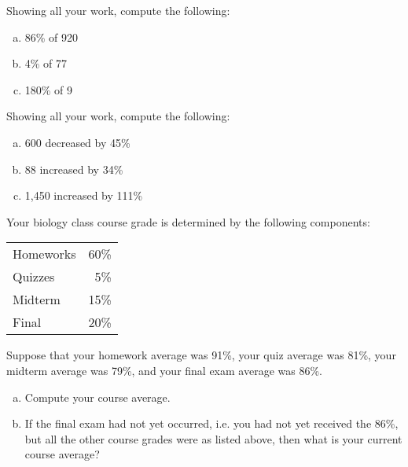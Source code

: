 \documentclass[11pt,letterpaper]{article}
\begin{document}

 Showing all your work, compute the following:
	\begin{enumerate}[(a)]
	\item 86\% of 920
	\item 4\% of 77
	\item 180\% of 9
	\end{enumerate}



\newpage



 Showing all your work, compute the following:
	\begin{enumerate}[(a)]
	\item 600 decreased by 45\%
	\item 88 increased by 34\%
	\item 1,450 increased by 111\%
	\end{enumerate}



\newpage



 Your biology class course grade is determined by the following components: \par
	\begin{table}[h]
	\centering
	\begin{tabular}{lr}
	Homeworks & 60\% \\
	Quizzes & 5\% \\
	Midterm & 15\% \\
	Final & 20\% \\
	\end{tabular}
	\end{table} \par
Suppose that your homework average was 91\%, your quiz average was 81\%, your midterm average was 79\%, and your final exam average was 86\%.
	\begin{enumerate}[(a)]
	\item Compute your course average.
	\item If the final exam had not yet occurred, i.e. you had not yet received the 86\%, but all the other course grades were as listed above, then what is your current course average?
	\end{enumerate}
\end{document}
